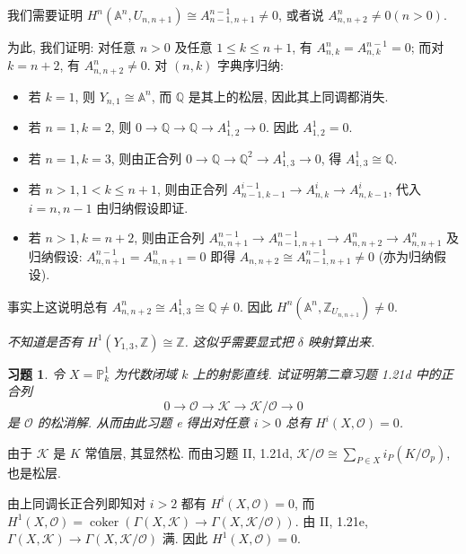 \documentclass{article}
\theoremstyle{exercise}
\newtheorem{exercise}{习题}[section]
\theoremstyle{plain}
\theoremstyle{remark}
\newenvironment{proofc}{\proof}{\endproof}
\def\A{\mathbb{A}}
\def\P{\mathbb{P}}
\def\Z{\mathbb{Z}}
\def\Q{\mathbb{Q}}
\def\sO{\mathscr{O}}
\def\sK{\mathscr{K}}
\def\coker{\operatorname{coker}}
\def\leq{\leqslant}
\begin{document}
\begin{proofc}
\begin{enumerate}
          我们需要证明 $H^n(\A^n, U_{n, n+1}) \cong A_{n-1, n+1}^{n-1} \neq 0$, 或者说 $A_{n, n+2}^n \neq 0 (n > 0)$.

          为此, 我们证明: 对任意 $n > 0$ 及任意 $1 \leq k \leq n + 1$, 有 $A_{n, k}^n = A_{n, k}^{n-1} = 0$;
          而对 $k = n + 2$, 有 $A_{n, n+2}^n \neq 0$.
          对 $(n, k)$ 字典序归纳:
          \begin{itemize}
            \item 若 $k = 1$, 则 $Y_{n, 1} \cong \A^n$, 而 $\Q$ 是其上的松层, 因此其上同调都消失.
            \item 若 $n = 1, k = 2$, 则 $0 \to \Q \to \Q \to A_{1, 2}^1 \to 0$. 因此 $A_{1, 2}^1 = 0$.
            \item 若 $n = 1, k = 3$, 则由正合列 $0 \to \Q \to \Q^2 \to A_{1, 3}^1 \to 0$, 得 $A_{1, 3}^1 \cong \Q$.
            \item 若 $n > 1, 1 < k \leq n + 1$,
                  则由正合列 $A_{n-1, k-1}^{i-1} \to A_{n, k}^i \to A_{n, k-1}^i$,
                  代入 $i = n, n-1$ 由归纳假设即证.
            \item 若 $n > 1, k = n + 2$, 则由正合列 $A_{n, n+1}^{n-1} \to A_{n-1, n+1}^{n-1} \to A_{n, n+2}^n \to A_{n, n+1}^n$
                  及归纳假设: $A_{n, n+1}^{n-1} = A_{n, n+1}^n = 0$ 即得 $A_{n, n+2} \cong A_{n-1, n+1}^{n-1} \neq 0$ (亦为归纳假设).
          \end{itemize}
          事实上这说明总有 $A_{n, n+2}^n \cong A_{1, 3}^1 \cong \Q \neq 0$.
          因此 $H^n(\A^n, \Z_{U_{n, n+1}}) \neq 0$.

          \textit{不知道是否有 $H^1(Y_{1, 3}, \Z) \cong \Z$. 这似乎需要显式把 $\delta$ 映射算出来.}
          \qedhere
  \end{enumerate}
\end{proofc}

\begin{exercise}
  令 $X = \P_k^1$ 为代数闭域 $k$ 上的射影直线.
  试证明第二章习题 1.21d 中的正合列
  \[ 0 \to \sO \to \sK \to \sK / \sO \to 0 \]
  是 $\sO$ 的松消解. 从而由此习题 e 得出对任意 $i > 0$ 总有 $H^i(X, \sO) = 0$.
\end{exercise}

\begin{proofc}
  由于 $\sK$ 是 $K$ 常值层, 其显然松.
  而由习题  II, 1.21d, $\sK / \sO \cong \sum_{P \in X} i_P(K / \sO_p)$,
  也是松层.

  由上同调长正合列即知对 $i > 2$ 都有 $H^i(X, \sO) = 0$,
  而 $H^1(X, \sO) = \coker(\Gamma(X, \sK) \to \Gamma(X, \sK / \sO))$.
  由 II, 1.21e, $\Gamma(X, \sK) \to \Gamma(X, \sK / \sO)$ 满. 因此 $H^1(X, \sO) = 0$.
\end{proofc}
\end{document}
